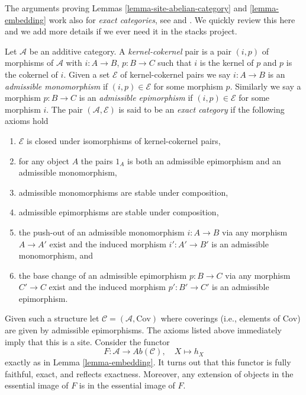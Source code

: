 \begin{remark}
\label{remark-embed-exact-category}
The arguments proving
Lemmas \ref{lemma-site-abelian-category} and
\ref{lemma-embedding}
work also for {\it exact categories}, see
\cite[Appendix A]{Buhler} and
\cite[1.1.4]{BBD}.
We quickly review this here and we add more details if we ever
need it in the stacks project.

\medskip\noindent
Let $\mathcal{A}$ be an additive category.
A {\it kernel-cokernel} pair is a pair $(i, p)$
of morphisms of $\mathcal{A}$ with
$i : A \to B$, $p : B \to C$ such that $i$ is the kernel of
$p$ and $p$ is the cokernel of $i$.
Given a set $\mathcal{E}$ of kernel-cokernel pairs we say
$i : A \to B$ is an {\it admissible monomorphism}
if $(i, p) \in \mathcal{E}$ for some morphism $p$.
Similarly we say a morphism $p : B \to C$ is an {\it admissible epimorphism}
if $(i, p) \in \mathcal{E}$ for some morphism $i$.
The pair $(\mathcal{A}, \mathcal{E})$ is said to be an
{\it exact category} if the following axioms hold
\begin{enumerate}
\item $\mathcal{E}$ is closed under isomorphisms of kernel-cokernel
pairs,
\item for any object $A$ the pairs $1_A$ is both an admissible epimorphism
and an admissible monomorphism,
\item admissible monomorphisms are stable under composition,
\item admissible epimorphisms are stable under composition,
\item the push-out of an admissible monomorphism $i : A \to B$ via
any morphism $A \to A'$ exist and the induced morphism $i' : A' \to B'$
is an admissible monomorphism, and
\item the base change of an admissible epimorphism $p : B \to C$ via
any morphism $C' \to C$ exist and the induced morphism $p' : B' \to C'$
is an admissible epimorphism.
\end{enumerate}
Given such a structure let $\mathcal{C} = (\mathcal{A}, \text{Cov})$
where coverings (i.e., elements of $\text{Cov}$) are given by
admissible epimorphisms. The axioms listed above
immediately imply that this is a site. Consider the functor
$$
F : \mathcal{A} \longrightarrow \textit{Ab}(\mathcal{C}), \quad
X \longmapsto h_X
$$
exactly as in
Lemma \ref{lemma-embedding}.
It turns out that this functor is fully faithful, exact, and reflects
exactness. Moreover, any extension of objects in the essential image
of $F$ is in the essential image of $F$.
\end{remark}






